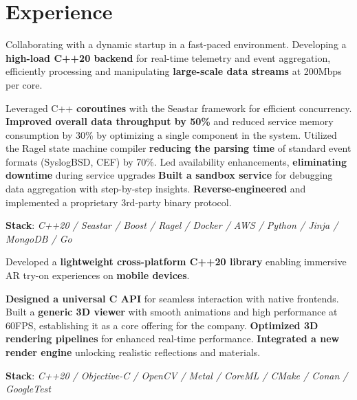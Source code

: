 \documentclass[]{deedy-resume}
\begin{document}
\begin{minipage}[t]{0.70\textwidth}


\section{Experience}


Collaborating with a dynamic startup in a fast-paced environment.
Developing a \textbf{high-load C++20 backend} for real-time telemetry and event aggregation,
efficiently processing and manipulating \textbf{large-scale data streams} at 200Mbps per core.
\begin{descritemize}
    \descritem Leveraged C++ \textbf{coroutines} with the Seastar framework for efficient concurrency.
    \descritem \textbf{Improved overall data throughput by 50\%} and reduced service memory consumption by 30\% by optimizing a single component in the system.
    \descritem Utilized the Ragel state machine compiler \textbf{reducing the parsing time} of standard event formats (SyslogBSD, CEF) by 70\%.
    \descritem Led availability enhancements, \textbf{eliminating downtime} during service upgrades
    \descritem \textbf{Built a sandbox service} for debugging data aggregation with step-by-step insights.
    \descritem \textbf{Reverse-engineered} and implemented a proprietary 3rd-party binary protocol.
\end{descritemize}
\textbf{Stack}: \textit{C++20 / Seastar / Boost / Ragel / Docker / AWS / Python / Jinja / MongoDB / Go}

\sectionspace



Developed a \textbf{lightweight cross-platform C++20 library} enabling immersive AR try-on experiences on \textbf{mobile devices}.
\begin{descritemize}
    \descritem \textbf{Designed a universal C API} for seamless interaction with native frontends.
    \descritem Built a \textbf{generic 3D viewer} with smooth animations and high performance at 60FPS, establishing it as a core offering for the company.
    \descritem \textbf{Optimized 3D rendering pipelines} for enhanced real-time performance.
    \descritem \textbf{Integrated a new render engine} unlocking realistic reflections and materials.
\end{descritemize}
\textbf{Stack}: \textit{C++20 / Objective-C / OpenCV / Metal / CoreML / CMake / Conan / GoogleTest}


\end{minipage}
\end{document}
